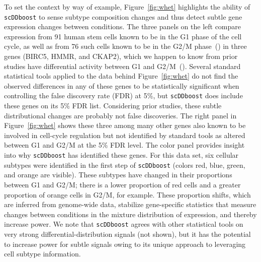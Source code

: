 \documentclass[aoas,preprint]{imsart}
\begin{document}
To set the context by way of example, 
Figure~\ref{fig:whet} highlights the ability of \verb+scDDboost+ to sense subtype composition changes 
and thus detect subtle gene expression changes between conditions.
The three panels on the left compare expression from 91 human 
stem cells known to be in the G1 phase of the cell cycle, as well as
from 76 such cells known to be in the G2/M phase~(\cite{ref:Leng}) in three genes (BIRC5, HMMR, and CKAP2), which we happen to know from prior studies have differential activity between G1 and G2/M~(\cite{BIRC5,HMMR,RAD21}).  
Several standard statistical tools applied to the data behind Figure~\ref{fig:whet} do not find the observed
 differences in any of these genes
to be statistically significant when controlling the false discovery rate (FDR) at 5\%,
but \verb+scDDboost+ does include these genes on its 5\% FDR list.
Considering prior studies, these subtle distributional changes are probably not false discoveries. 
The right panel in Figure~\ref{fig:whet} shows these three among 
many other genes also known to be involved in cell-cycle regulation but
not identified by standard tools as altered between G1 and G2/M at the 5\% FDR level.    
The color panel provides insight into 
why \verb+scDDboost+ has identified these genes.  For this data set, six cellular subtypes 
were identified in the first step of \verb+scDDboost+ (colors red, blue, green, and orange are visible). 
These subtypes have changed in their proportions between G1 and G2/M;  there is a lower proportion 
of red cells and a greater proportion of orange cells in G2/M, for example. These proportion shifts, 
which are inferred from genome-wide data, stabilize gene-specific statistics that measure 
changes between conditions in the mixture distribution of expression, and thereby increase power.  
We note that \verb+scDDboost+ 
agrees with other statistical tools on very strong differential-distribution signals (not shown), but it 
has the potential to increase power for subtle signals owing to its unique approach to leveraging cell subtype
information.
\end{document}
